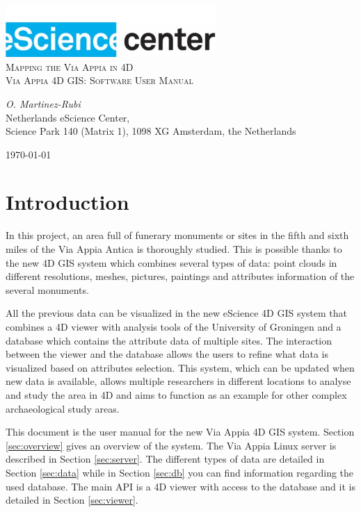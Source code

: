 \documentclass[a4paper,11pt]{article}
\begin{document}
\begin{titlepage}
\begin{center}
\includegraphics[width=0.6\textwidth]{fig/logo}\\[3cm]    
\textsc{\LARGE Mapping the Via Appia in 4D}\\[0.5cm]
\textsc{\large Via Appia 4D GIS: Software User Manual}\\[0.5cm]
\vfill
\end{center}
{\large
\emph{O. Martinez-Rubi } \\
}
{\large
{Netherlands eScience Center, \\
Science Park 140 (Matrix 1), 1098 XG Amsterdam, the Netherlands\\
}
}
\begin{center}
{\large \today}
\end{center}
\end{titlepage}

\tableofcontents

\newpage


\section{Introduction}

In this project, an area full of funerary monuments or sites in the fifth and sixth miles of the Via Appia Antica is thoroughly studied. This is possible thanks to the new 4D GIS system which combines several types of data: point clouds in different resolutions, meshes, pictures, paintings and attributes information of the several monuments.

All the previous data can be visualized in the new eScience 4D GIS system that combines a 4D viewer with analysis tools of the University of Groningen and a database which contains the attribute data of multiple sites. The interaction between the viewer and the database allows the users to refine what data is visualized based on attributes selection. This system, which can be updated when new data is available, allows multiple researchers in different locations to analyse and study the area in 4D and aims to function as an example for other complex archaeological study areas.

This document is the user manual for the new Via Appia 4D GIS system. Section \ref{sec:overview} gives an overview of the system. The Via Appia Linux server is described in Section \ref{sec:server}. The different types of data are detailed in Section \ref{sec:data} while in Section \ref{sec:db} you can find information regarding the used database. The main API is a 4D viewer with access to the database and it is detailed in Section \ref{sec:viewer}. %
\end{document}
